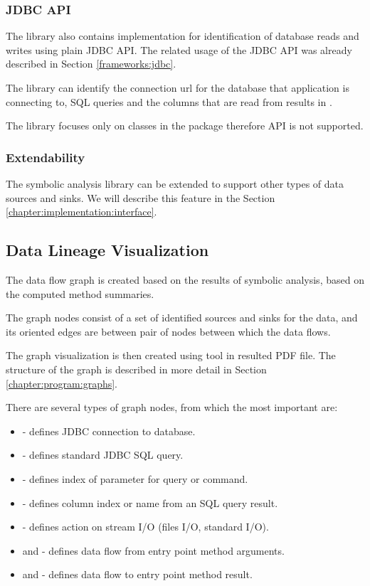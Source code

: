 \subsubsection{JDBC API}

The library also contains implementation for identification of
database reads and writes using plain JDBC API.
The related usage of the JDBC API was already described in Section \ref{frameworks:jdbc}.

The library can identify the connection url for the database
that application is connecting to, SQL queries and the columns
that are read from results in .

The library focuses only on classes in the package 
therefore  API is not supported.



\subsubsection{Extendability}

The symbolic analysis library can be extended to support other types
of data sources and sinks. We will describe this feature in the Section \ref{chapter:implementation:interface}.



\subsection{Data Lineage Visualization \label{chapter:analysis:visualization}}

The data flow graph is created based on the results of symbolic analysis, based on
the computed method summaries.

The graph nodes consist of a set of identified sources and sinks for the data,
and its oriented edges are between pair of nodes between which the data flows.

The graph visualization is then created using \citet{Graphviz} tool in resulted PDF file.
The structure of the graph is described in more detail in Section \ref{chapter:program:graphs}.

There are several types of graph nodes, from which the most important are:
\begin{itemize}
  \item {} - defines JDBC connection to database.
  \item {} - defines standard JDBC SQL query.
  \item {} - defines index of parameter for query or command.
  \item {} - defines column index or name from an SQL query result.
  \item {} - defines action on stream I/O (files I/O, standard I/O).
  \item {} and  - defines data flow from entry point method arguments.
  \item {} and  - defines data flow to entry point method result.
\end{itemize}

